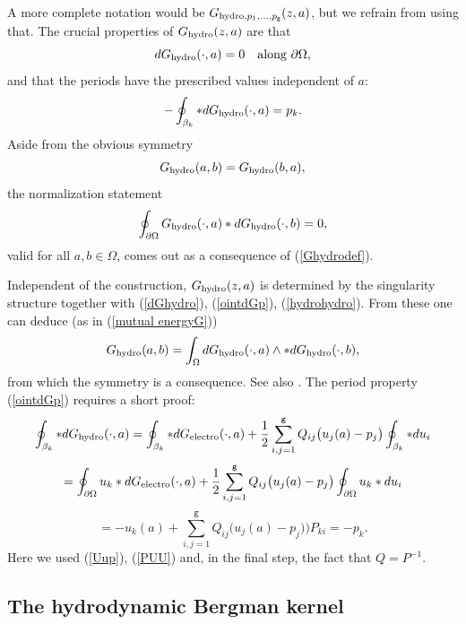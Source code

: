 \documentclass[reqno,12pt]{article}
\theoremstyle{plain}
\theoremstyle{definition}
\numberwithin{equation}{section}
\numberwithin{figure}{section}
\begin{document}
A more complete notation would be $G_{{\rm hydro}, p_1,\dots, p_\texttt{g}}(z,a)$, but we refrain from using that.
The crucial properties of $G_{\rm hydro}(z,a)$ are that
\begin{equation}\label{dGhydro}
dG_{\rm hydro}(\cdot,a)=0 \quad \text{along }\partial \Omega,
\end{equation}
and that the periods have the prescribed values independent of $a$:
\begin{equation}\label{ointdGp}
-\oint_{\beta_k} *dG_{\rm hydro}(\cdot,a)=p_k.
\end{equation}
Aside from the obvious symmetry
$$
G_{\rm hydro}(a,b)=G_{\rm hydro}(b,a),
$$
the normalization statement
\begin{equation}\label{hydrohydro}
\oint_{\partial\Omega}G_{\rm hydro}(\cdot,a)*dG_{\rm hydro}(\cdot,b)=0,
\end{equation}
valid for all $a,b\in\Omega$, comes out as a consequence of (\ref{Ghydrodef}).

Independent of the construction, $G_{\rm hydro}(z,a)$ is determined by the singularity structure
together with (\ref{dGhydro}), (\ref{ointdGp}), (\ref{hydrohydro}).
From these one can deduce (as in (\ref{mutual energyG}))
$$
G_{\rm hydro}(a,b)=\int_\Omega dG_{\rm hydro}(\cdot, a)\wedge *dG_{\rm hydro}(\cdot, b),
$$
from which the symmetry is a consequence. 
See also \cite{Grotta-Ragazzo-Gustafsson-Koiller-2024}.
The period property (\ref{ointdGp}) requires a short proof:
$$
\oint_{\beta_k}*dG_{\rm hydro}(\cdot, a)=\oint_{\beta_k}*dG_{\rm electro}(\cdot,a)
+\frac{1}{2}\sum_{i,j=1}^{\texttt g}Q_{ij}\big(u_j(a)-p_j\big)\oint_{\beta_k}*du_i 
$$
$$
=\oint_{\partial \Omega}{u_k}*dG_{\rm electro}(\cdot, a)
+\frac{1}{2}\sum_{i,j=1}^{\texttt g}Q_{ij}\big(u_j(a)-p_j\big)\oint_{\partial\Omega}u_k *du_i
$$
$$
=-u_k(a)+\sum_{i,j=1}^{\texttt g}Q_{ij}\big(u_j(a)-p_j\big))P_{ki}=-p_k.
$$
Here we used (\ref{Uup}), (\ref{PUU}) and, in the final step, the fact that $Q=P^{-1}$.


\subsection{The hydrodynamic Bergman kernel}\label{sec:hydrodynamic Bergman} 
\end{document}
